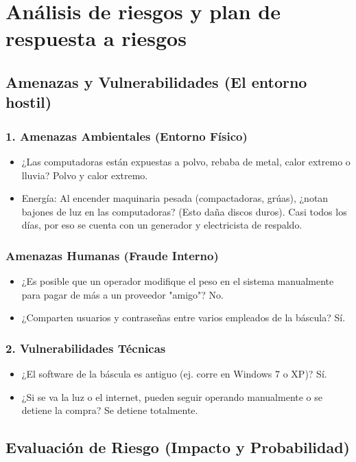 \section{Análisis de riesgos y plan de respuesta a riesgos}
\subsection{Amenazas y Vulnerabilidades (El entorno hostil)}
\subsubsection{1. Amenazas Ambientales (Entorno Físico)}
\begin{itemize}
    \item ¿Las computadoras están expuestas a polvo, rebaba de metal, calor extremo o lluvia? Polvo y calor extremo.
    \item Energía: Al encender maquinaria pesada (compactadoras, grúas), ¿notan bajones de luz en las computadoras? (Esto daña discos duros). Casi todos los días, por eso se cuenta con un generador y electricista de respaldo.
\end{itemize}
\subsubsection{Amenazas Humanas (Fraude Interno)}
\begin{itemize}
    \item ¿Es posible que un operador modifique el peso en el sistema manualmente para pagar de más a un proveedor "amigo"? No.
    \item ¿Comparten usuarios y contraseñas entre varios empleados de la báscula? Sí.
\end{itemize}
\subsubsection{2. Vulnerabilidades Técnicas}
\begin{itemize}
    \item ¿El software de la báscula es antiguo (ej. corre en Windows 7 o XP)? Sí.
    \item ¿Si se va la luz o el internet, pueden seguir operando manualmente o se detiene la compra? Se detiene totalmente.
\end{itemize}

\subsection{Evaluación de Riesgo (Impacto y Probabilidad)}
